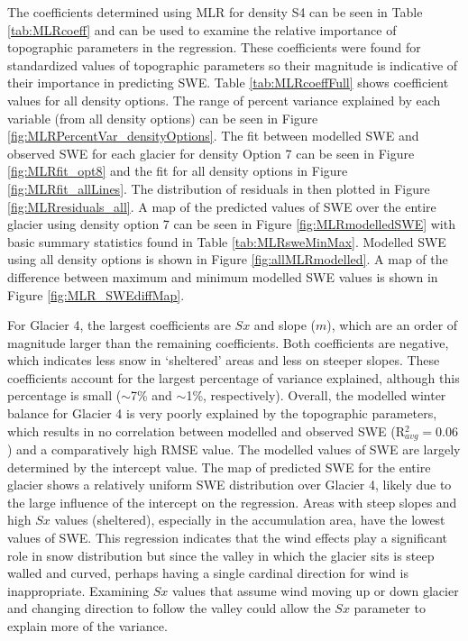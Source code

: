\documentclass[12pt]{article}
\begin{document}
The coefficients determined using MLR for density S4 can be seen in Table \ref{tab:MLRcoeff} and can be used to examine the relative importance of topographic parameters in the regression. These coefficients were found for standardized values of topographic parameters so their magnitude is indicative of their importance in predicting SWE. Table \ref{tab:MLRcoeffFull} shows coefficient values for all density options. The range of percent variance explained by each variable (from all density options) can be seen in Figure \ref{fig:MLRPercentVar_densityOptions}. The fit between modelled SWE and observed SWE for each glacier for density Option 7 can be seen in Figure \ref{fig:MLRfit_opt8} and the fit for all density options in Figure \ref{fig:MLRfit_allLines}. The distribution of residuals in then plotted in Figure \ref{fig:MLRresiduals_all}. A map of the predicted values of SWE over the entire glacier using density option 7 can be seen in Figure \ref{fig:MLRmodelledSWE} with basic summary statistics found in Table \ref{tab:MLRsweMinMax}. Modelled SWE using all density options is shown in Figure \ref{fig:allMLRmodelled}. A map of the difference between maximum and minimum modelled SWE values is shown in Figure \ref{fig:MLR_SWEdiffMap}.

For Glacier 4, the largest coefficients are $Sx$ and slope ($m$), which are an order of magnitude larger than the remaining coefficients. Both coefficients are negative, which indicates less snow in `sheltered' areas and less on steeper slopes. These coefficients account for the largest percentage of variance explained, although this percentage is small ($\sim$7\% and $\sim$1\%, respectively). Overall, the modelled winter balance for Glacier 4 is very poorly explained by the topographic parameters, which results in no correlation between modelled and observed SWE (R$^2_{avg}=0.06$) and a comparatively high RMSE value. The modelled values of SWE are largely determined by the intercept value. The map of predicted SWE for the entire glacier shows a relatively uniform SWE distribution over Glacier 4, likely due to the large influence of the intercept on the regression. Areas with steep slopes and high $Sx$ values (sheltered), especially in the accumulation area, have the lowest values of SWE. This regression indicates that the wind effects play a significant role in snow distribution but since the valley in which the glacier sits is steep walled and curved, perhaps having a single cardinal direction for wind is inappropriate. Examining $Sx$ values that assume wind moving up or down glacier and changing direction to follow the valley could allow the $Sx$ parameter to explain more of the variance. 
\end{document}
